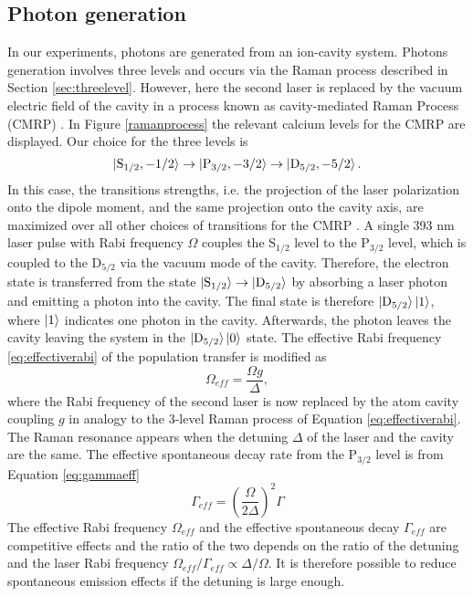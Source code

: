 \subsection{Photon generation}
\label{sec:ramanprocess}
In our experiments, photons are generated from an ion-cavity system. Photons generation involves three levels and occurs via the Raman process described in Section \ref{sec:threelevel}. However, here the second laser is replaced by the vacuum electric field of the cavity in a process known as cavity-mediated Raman Process (CMRP) \cite{stuteinterface}. In Figure \ref{ramanprocess} the relevant calcium levels for the CMRP are displayed. Our choice for the three levels is
\begin{equation}
\ket{\text{S}_{1/2},-1/2}\to\ket{\text{P}_{3/2},-3/2} \to \ket{\text{D}_{5/2},-5/2}.
\end{equation}
In this case, the transitions strengths, i.e. the projection of the laser polarization onto the dipole moment, and the same projection onto the cavity axis, are maximized over all other choices of transitions for the CMRP \cite{stuteinterface}. A single 393 nm laser pulse with Rabi frequency $\Omega$ couples the $\text{S}_{1/2}$ level to the $\text{P}_{3/2}$ level, which is coupled to the $\text{D}_{5/2}$ via the vacuum mode of the cavity. Therefore, the electron state is transferred from the state $\ket{\text{S}_{1/2}} \to \ket{\text{D}_{5/2}}$  by absorbing a laser photon and emitting a photon into the cavity. The final state is therefore $\ket{\text{D}_{5/2}}\ket{1}$, where $\ket{1}$ indicates one photon in the cavity. Afterwards, the photon leaves the cavity leaving the system in the $\ket{\text{D}_{5/2}}\ket{0}$ state. The effective Rabi frequency \eqref{eq:effectiverabi} of the population transfer is modified as \cite{Barros2009}
\begin{equation}
\label{omegaeff}
\Omega_{eff} = \frac{\Omega g}{\Delta},
\end{equation}
where the Rabi frequency of the second laser is now replaced by the atom cavity coupling $g$ in analogy to the 3-level Raman process of Equation \eqref{eq:effectiverabi}. The Raman resonance appears when the detuning $\Delta$ of the laser and the cavity are the same. The effective spontaneous decay rate from the $\text{P}_{3/2}$ level is from Equation \eqref{eq:gammaeff}
\begin{equation}
\label{gammaeff}
\Gamma_{eff} = \left(\frac{\Omega}{2\Delta}\right)^2\Gamma
\end{equation}
The effective Rabi frequency $\Omega_{eff}$ and the effective spontaneous decay $\Gamma_{eff}$ are competitive effects and the ratio of the two depends on the ratio of the detuning and the laser Rabi frequency $\Omega_{eff}/\Gamma_{eff} \propto \Delta/\Omega$. It is therefore possible to reduce spontaneous emission effects if the detuning is large enough.\par
